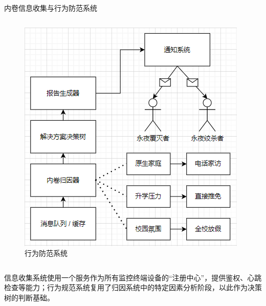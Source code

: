 \begin{frame}{内卷信息收集与行为防范系统}
\begin{columns}
            \begin{figure}
                \centering
                 \includegraphics[width=\textwidth]{contents/figure/collector-part-2.png}
                \caption{行为防范系统}
                \label{fig:collector-part-2}
            \end{figure}
        \end{columns}

        \small 信息收集系统使用一个服务作为所有监控终端设备的“注册中心”，提供鉴权、心跳检查等能力；行为规范系统复用了归因系统中的特定因素分析阶段，以此作为决策树的判断基础。
    \end{frame}


